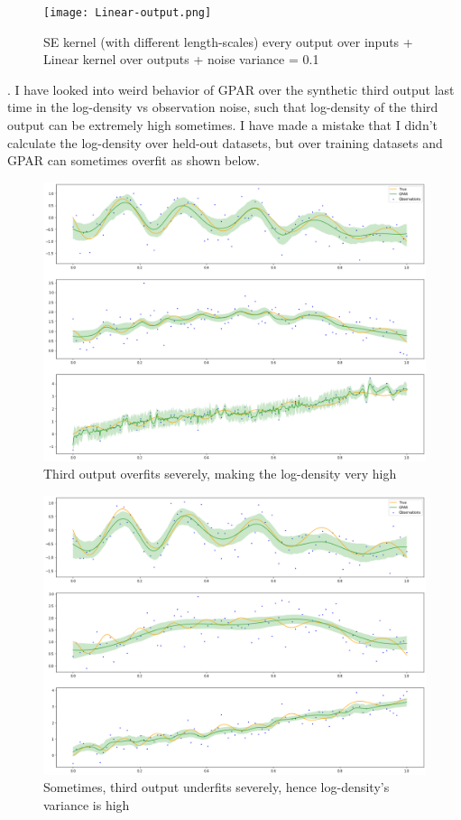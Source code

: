 \documentclass{article}
\begin{document}
\begin{figure}[H]
\centering
\texttt{[image: Linear-output.png]}
\caption{SE kernel (with different length-scales) every output over inputs + Linear kernel over outputs + noise variance = 0.1}
\end{figure}

.	I have looked into weird behavior of GPAR over the synthetic third output last time in the log-density vs observation noise, such that log-density of the third output can be extremely high sometimes. I have made a mistake that I didn’t calculate the log-density over held-out datasets, but over training datasets and GPAR can sometimes overfit as shown below. 
\begin{figure}[H]
\centering
\includegraphics[width=.8\linewidth]{gpar-run-3.png}
\caption{Third output overfits severely, making the log-density very high}
\end{figure}
\begin{figure}[H]
\centering
\includegraphics[width=.8\linewidth]{gpar-run-4.png}
\caption{Sometimes, third output underfits severely, hence log-density’s variance is high}
\end{figure}
\end{document}
